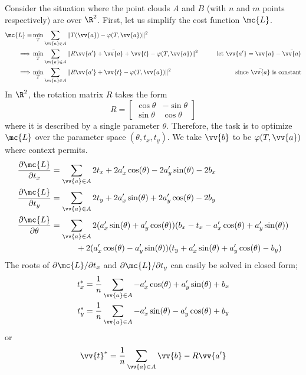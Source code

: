 \documentclass[12pt]{article}
\theoremstyle{defstyle}
\begin{document}
Consider the situation where the point clouds $A$ and $B$ (with $n$ and $m$ points respectively) are over $\R^2$.
First, let us simplify the cost function $\mc{L}$.
\begin{alignat*}{2}
    \mc{L} = & \min\limits_{\substack{T}} \sum_{\vv{a} \in A} \| T(\vv{a}) - \varphi(T, \vv{a}) \|^2                                                                              \\
    \implies & \min\limits_{\substack{T}} \sum_{\vv{a} \in A} \| R\vv{a'} + \bar{\vv{a}} + \vv{t} - \varphi(T, \vv{a}) \|^2 & \qquad \text{let $\vv{a'} = \vv{a} - \bar{\vv{a}}$} \\
    \implies & \min\limits_{\substack{T}} \sum_{\vv{a} \in A} \| R\vv{a'} + \vv{t} - \varphi(T, \vv{a}) \|^2                & \qquad \text{since $\bar{\vv{a}}$ is constant}
\end{alignat*}
In $\R^2$, the rotation matrix $R$ takes the form
\[
    R = \begin{bmatrix}
        \cos \theta & -\sin \theta \\
        \sin \theta & \cos \theta
    \end{bmatrix}
\]
where it is described by a single parameter $\theta$.
Therefore, the task is to optimize $\mc{L}$ over the parameter space $(\theta, t_x, t_y)$.
We take $\vv{b}$ to be $\varphi(T, \vv{a})$ where context permits.
\begin{align*}
    \frac{\partial \mc{L}}{\partial t_x}    & = \sum_{\vv{a} \in A} 2t_x + 2a'_x\cos(\theta) - 2a'_y\sin(\theta) -2b_x                                      \\
    \frac{\partial \mc{L}}{\partial t_y}    & = \sum_{\vv{a} \in A} 2t_y + 2a'_x\sin(\theta) + 2a'_y\cos(\theta) -2b_y                                      \\
    \frac{\partial \mc{L}}{\partial \theta} & = \sum_{\vv{a} \in A} 2(a'_x\sin(\theta) + a'_y\cos(\theta))(b_x - t_x - a'_x\cos(\theta) + a'_y\sin(\theta)) \\
                                            & \quad \quad \quad + 2(a'_x\cos(\theta) - a'_y \sin(\theta))(t_y + a'_x\sin(\theta) + a'_y\cos(\theta) - b_y)
\end{align*}
The roots of $\partial \mc{L}/\partial t_x$ and $\partial \mc{L}/\partial t_y$ can easily be solved in closed form;
\begin{gather*}
    t_x^* = \frac{1}{n} \sum_{\vv{a} \in A} -a'_x\cos(\theta) + a'_y\sin(\theta) + b_x \\
    t_y^* = \frac{1}{n} \sum_{\vv{a} \in A} -a'_x\sin(\theta) - a'_y\cos(\theta) + b_y
\end{gather*}
or
\[
    \vv{t}^* = \frac{1}{n} \sum_{\vv{a} \in A} \vv{b} - R \vv{a'}
\]
\end{document}
